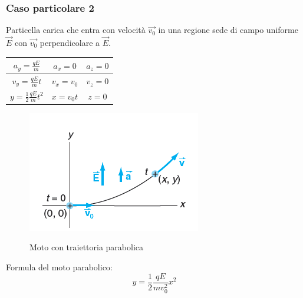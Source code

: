 \subsubsection{Caso particolare 2}
Particella carica che entra con velocità $\vec{v_0}$ in una regione sede di campo uniforme $\vec{E}$ con $\vec{v_0}$ perpendicolare a $\vec{E}$.


\begin{center}
    \begin{tabular}{|c|c|c|}
        \hline 
        $a_y=\frac{qE}{m}$ & $a_x = 0$ & $a_z = 0$ \\ [0.5ex]
        \hline
        $v_y=\frac{qE}{m}t$ & $v_x = v_0$ & $v_z = 0$ \\ [0.5ex]
        \hline
        $y=\frac{1}{2}\frac{qE}{m}t^2$ & $x = v_0 t$ & $z = 0$ \\ [0.5ex]
        \hline
    \end{tabular}
\end{center}

\begin{figure}[H]
    \centering
    \includegraphics[width=0.3\linewidth]{imgs/2 - moto di proiettile.png}
    \label{fig:moto_parabolico}
    \caption{Moto con traiettoria parabolica}
\end{figure}
Formula del moto parabolico:
\begin{equation}
    y = \frac{1}{2}\frac{qE}{mv_0^2}x^2
\end{equation}

